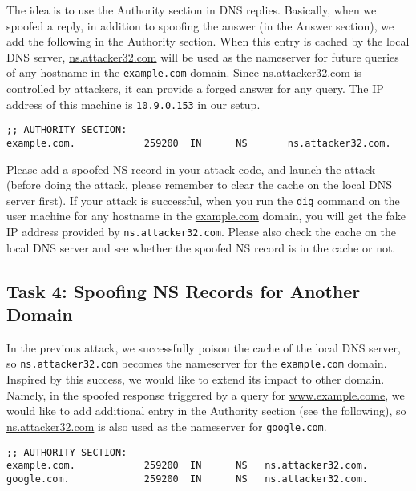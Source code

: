 The idea is to use the Authority section in DNS replies. 
Basically, when we spoofed a reply, in addition to spoofing the answer (in
the Answer section), we add the following in the Authority section.
When this entry is cached by the local DNS server, \url{ns.attacker32.com}
will be used as the nameserver for future queries of 
any hostname in the \texttt{example.com} domain.  Since 
\url{ns.attacker32.com} is controlled by attackers, it can
provide a forged answer for any query. The IP address 
of this machine is \texttt{10.9.0.153} in our setup. 

\begin{lstlisting}
;; AUTHORITY SECTION:
example.com.            259200  IN      NS       ns.attacker32.com.
\end{lstlisting}
 

Please add a spoofed NS record in your attack code, and launch the 
attack (before doing the attack, please remember to clear the cache on 
the local DNS server first).
If your attack is successful, when you run the \texttt{dig} command 
on the user machine for any hostname in the \url{example.com} domain, you will
get the fake IP address provided by \texttt{ns.attacker32.com}. Please also
check the cache on the local DNS server and see whether the spoofed 
NS record is in the cache or not.



\subsection{Task 4: Spoofing NS Records for Another Domain} 

In the previous attack, we successfully poison the cache of the local DNS
server, so \texttt{ns.attacker32.com} becomes the nameserver for the 
\texttt{example.com} domain. Inspired by this success, we would like to 
extend its impact to other domain. Namely, 
in the spoofed response triggered by a query for
\url{www.example.come}, we would like to add additional entry
in the Authority section (see the following), so
\url{ns.attacker32.com} is also used as the nameserver for 
\texttt{google.com}.  


\begin{lstlisting}
;; AUTHORITY SECTION:
example.com.            259200  IN      NS   ns.attacker32.com.
google.com.             259200  IN      NS   ns.attacker32.com.
\end{lstlisting}

